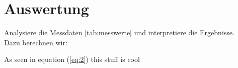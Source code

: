 \section{Auswertung}
Analysiere die Messdaten \ref{tab:messwerte} und interpretiere die Ergebnisse. \\
Dazu berechnen wir:

As seen in equation (\ref{eq:2}) this stuff is cool